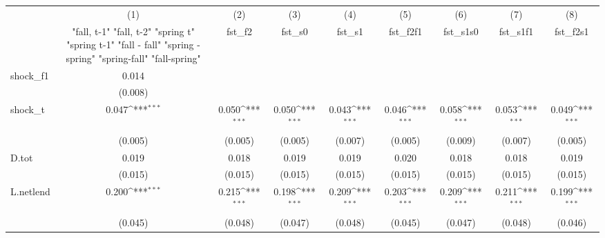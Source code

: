 {
\def\sym#1{\ifmmode^{#1}\else\(^{#1}\)\fi}
\begin{tabular}{l*{8}{c}}
\toprule
            &\multicolumn{1}{c}{(1)}&\multicolumn{1}{c}{(2)}&\multicolumn{1}{c}{(3)}&\multicolumn{1}{c}{(4)}&\multicolumn{1}{c}{(5)}&\multicolumn{1}{c}{(6)}&\multicolumn{1}{c}{(7)}&\multicolumn{1}{c}{(8)}\\
            &\multicolumn{1}{c}{  "fall, t-1" "fall, t-2" "spring t" "spring t-1"  "fall - fall" "spring - spring" "spring-fall" "fall-spring" }&\multicolumn{1}{c}{fst\_f2}&\multicolumn{1}{c}{fst\_s0}&\multicolumn{1}{c}{fst\_s1}&\multicolumn{1}{c}{fst\_f2f1}&\multicolumn{1}{c}{fst\_s1s0}&\multicolumn{1}{c}{fst\_s1f1}&\multicolumn{1}{c}{fst\_f2s1}\\
\midrule
shock\_f1    &       0.014         &                     &                     &                     &                     &                     &                     &                     \\
            &     (0.008)         &                     &                     &                     &                     &                     &                     &                     \\
\addlinespace
shock\_t     &       0.047\sym{***}&       0.050\sym{***}&       0.050\sym{***}&       0.043\sym{***}&       0.046\sym{***}&       0.058\sym{***}&       0.053\sym{***}&       0.049\sym{***}\\
            &     (0.005)         &     (0.005)         &     (0.005)         &     (0.007)         &     (0.005)         &     (0.009)         &     (0.007)         &     (0.005)         \\
\addlinespace
D.tot       &       0.019         &       0.018         &       0.019         &       0.019         &       0.020         &       0.018         &       0.018         &       0.019         \\
            &     (0.015)         &     (0.015)         &     (0.015)         &     (0.015)         &     (0.015)         &     (0.015)         &     (0.015)         &     (0.015)         \\
\addlinespace
L.netlend   &       0.200\sym{***}&       0.215\sym{***}&       0.198\sym{***}&       0.209\sym{***}&       0.203\sym{***}&       0.209\sym{***}&       0.211\sym{***}&       0.199\sym{***}\\
            &     (0.045)         &     (0.048)         &     (0.047)         &     (0.048)         &     (0.045)         &     (0.047)         &     (0.048)         &     (0.046)         \\

\end{tabular}}
